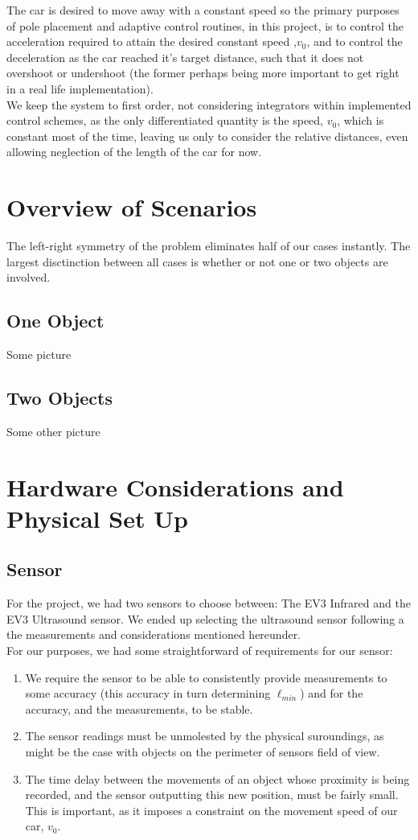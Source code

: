 \documentclass[a4paper,onecolumn,amsmath,amssymb]{revtex4-1}
\begin{document}
 
The car is desired to move away with a constant speed so the primary purposes of pole placement and adaptive control routines, in this project, is to control the acceleration required to attain the desired constant speed ,$v_0$, and to control the deceleration as the car reached it's target distance, such that it does not overshoot or undershoot (the former perhaps being more important to get right in a real life implementation).\\


We keep the system to first order, not considering integrators within implemented control schemes, as the only differentiated quantity is the speed, $v_0$, which is constant most of the time,  leaving us only to consider the relative distances, even allowing neglection of the length of the car for now. 

\section{\textbf{Overview of Scenarios}}

The left-right symmetry of the problem eliminates half of our cases instantly. The largest disctinction between all cases is whether or not one or two objects are involved.\\
\subsection{\textbf{One  Object}}
Some picture
\subsection{\textbf{Two Objects}}
Some other picture
\section{\textbf{ Hardware Considerations and Physical Set Up }}
\subsection{\textbf{Sensor}}
For the project, we had two sensors to choose between: The EV3 Infrared and the EV3 Ultrasound sensor. We ended up selecting the ultrasound sensor following a the measurements and considerations mentioned hereunder.\\
For our purposes, we had some straightforward of requirements for our sensor:
\begin{enumerate}
\item We require the sensor to be able to consistently provide measurements to some accuracy (this accuracy in turn determining $\ell_{min}$) and for the accuracy, and the measurements, to be stable.
\item The sensor readings must be unmolested by the physical suroundings, as might be the case with objects on the perimeter of sensors field of view.
\item The time delay between the movements of an object whose proximity is being recorded, and the sensor outputting this new position, must be fairly small. This is important, as it imposes a constraint on the movement speed of our car, $v_0$.
\end{enumerate}
\end{document}
